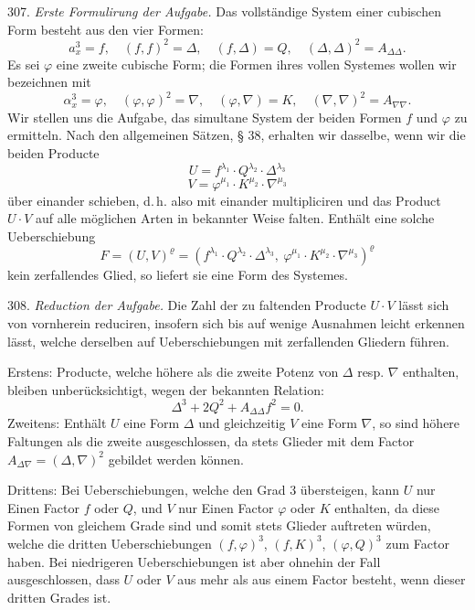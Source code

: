 307. \textit{Erste Formulirung der Aufgabe.} Das vollständige System einer
cubischen Form besteht aus den vier Formen:
\[
a_x^3 = f, \quad (f,f)^2 = \Delta, \quad (f,\Delta) = Q, \quad (\Delta,\Delta)^2 = A_{\Delta\Delta}.
\]
Es sei $\varphi$ eine zweite cubische Form; die Formen ihres vollen
Systemes wollen wir bezeichnen mit
\[
\alpha_x^3 = \varphi, \quad (\varphi,\varphi)^2 = \nabla, \quad (\varphi,\nabla) = K, \quad (\nabla,\nabla)^2 = A_{\nabla\nabla}.
\]
Wir stellen uns die Aufgabe, das simultane System der beiden Formen $f$ und
$\varphi$ zu ermitteln. Nach den allgemeinen Sätzen, § 38, erhalten wir
dasselbe, wenn wir die beiden Producte
\[
U = f^{\lambda_1}\cdot Q^{\lambda_2}\cdot \Delta^{\lambda_3}
\]
\[
V = \varphi^{\mu_1}\cdot K^{\mu_2}\cdot \nabla^{\mu_3}
\]
über einander schieben, d.\,h. also mit einander multipliciren und das
Product $U\cdot V$ auf alle möglichen Arten in bekannter Weise falten.
Enthält eine solche Ueberschiebung
\[
F = (U,V)^{\varrho} = (f^{\lambda_1}\cdot Q^{\lambda_2}\cdot \Delta^{\lambda_3}, \ \varphi^{\mu_1}\cdot K^{\mu_2}\cdot \nabla^{\mu_3})^{\varrho}
\]
kein zerfallendes Glied, so liefert sie eine Form des Systemes.

308. \textit{Reduction der Aufgabe.} Die Zahl der zu faltenden Producte
$U\cdot V$ lässt sich von vornherein reduciren, insofern sich bis auf
wenige Ausnahmen leicht erkennen lässt, welche derselben auf
Ueberschiebungen mit zerfallenden Gliedern führen.

Erstens: Producte, welche höhere als die zweite Potenz von $\Delta$ resp.
$\nabla$ enthalten, bleiben unberücksichtigt, wegen der bekannten Relation:
\[
\Delta^3 + 2Q^2 + A_{\Delta\Delta}f^2 = 0.
\]
Zweitens: Enthält $U$ eine Form $\Delta$ und gleichzeitig $V$ eine Form
$\nabla$, so sind höhere Faltungen als die zweite ausgeschlossen, da stets
Glieder mit dem Factor $A_{\Delta\nabla} = (\Delta,\nabla)^2$ gebildet
werden können.



Drittens: Bei Ueberschiebungen, welche den Grad 3 übersteigen, kann $U$ nur
Einen Factor $f$ oder $Q$, und $V$ nur Einen Factor $\varphi$ oder $K$
enthalten, da diese Formen von gleichem Grade sind und somit stets Glieder
auftreten würden, welche die dritten Ueberschiebungen $(f,\varphi)^3$,
$(f,K)^3$, $(\varphi,Q)^3$ zum Factor haben. Bei niedrigeren
Ueberschiebungen ist aber ohnehin der Fall ausgeschlossen, dass $U$ oder
$V$ aus mehr als aus einem Factor besteht, wenn dieser dritten Grades ist.

